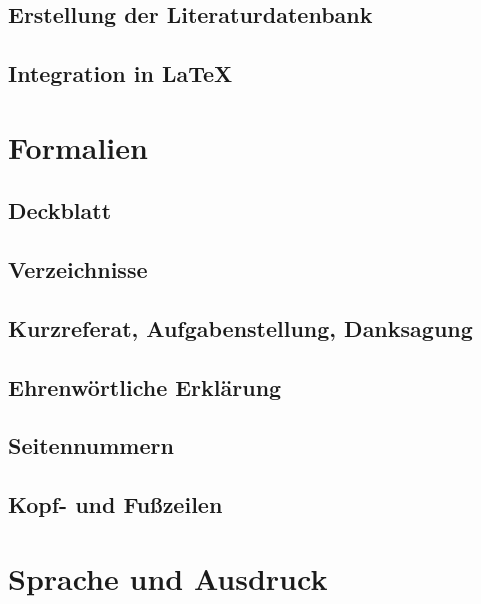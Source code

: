 \documentclass[twoside,a4paper,11pt,openright]{report}
\begin{document}
\subsection{Erstellung der Literaturdatenbank}


\subsection{Integration in \LaTeX}



\clearpage
\section{Formalien}

\subsection{Deckblatt}


\subsection{Verzeichnisse}
\label{sec:inhalt:form:toclists}


\subsection{Kurzreferat, Aufgabenstellung, Danksagung}


\subsection{Ehrenwörtliche Erklärung}


\subsection{Seitennummern}


\subsection{Kopf- und Fußzeilen}



\section{Sprache und Ausdruck}

\end{document}
